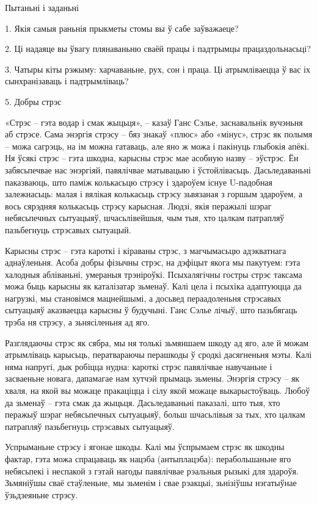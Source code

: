 Пытаньні і заданьні

1. Якія самыя раньнія прыкметы стомы вы ў сабе заўважаеце?

2. Ці надаяце вы ўвагу плянаваньню сваёй працы і падтрымцы працаздольнасьці?

3. Чатыры кіты рэжыму: харчаваньне, рух, сон і праца. Ці атрымліваецца ў вас іх сынхранізаваць і падтрымліваць?


5. Добры стрэс

«Стрэс – гэта водар і смак жыцьця», – казаў Ганс Сэлье, заснавальнік вучэньня аб стрэсе. Сама энэргія стрэсу – бяз знакаў «плюс» або «мінус», стрэс як полымя – можа сагрэць, на ім можна гатаваць, але яно ж можа і пакінуць глыбокія апёкі. Ня ўсякі стрэс – гэта шкодна, карысны стрэс мае асобную назву – эўстрэс. Ён забясьпечвае нас энэргіяй, павялічвае матывацыю і ўстойлівасьць. Дасьледаваньні паказваюць, што паміж колькасьцю стрэсу і здароўем існуе U-падобная залежнасьць: малая і вялікая колькасьць стрэсу зьвязаная з горшым здароўем, а вось сярэдняя колькасьць стрэсу карысная. Людзі, якія перажылі шэраг небясьпечных сытуацыяў, шчасьлівейшыя, чым тыя, хто цалкам патрапляў пазьбегнуць стрэсавых сытуацый.

Карысны стрэс – гэта кароткі і кіраваны стрэс, з магчымасьцю адэкватнага аднаўленьня. Асоба добры фізычны стрэс, на дэфіцыт якога мы пакутуем: гэта халодныя абліваньні, умераныя трэніроўкі. Псыхалягічны гостры стрэс таксама можа быць карысны як каталізатар зьменаў. Калі цела і псыхіка адаптуюцца да нагрузкі, мы становімся мацнейшымі, а досьвед пераадоленьня стрэсавых сытуацыяў аказваецца карысны ў будучыні. Ганс Сэлье лічыў, што пазьбягаць трэба ня стрэсу, а зьнясіленьня ад яго.

Разглядаючы стрэс як сябра, мы ня толькі зьмяншаем шкоду ад яго, але й можам атрымліваць карысьць, ператвараючы перашкоды ў сродкі дасягненьня мэты. Калі няма напругі, дык робіцца нудна: кароткі стрэс павялічвае навучаньне і засваеньне новага, дапамагае нам хутчэй прымаць зьмены. Энэргія стрэсу – як хваля, на якой вы можаце пракаціцца і сілу якой можаце выкарыстоўваць. Любоў да зьменаў – гэта смак да жыцьця. Дасьледаваньні паказалі, што тыя, хто перажыў шэраг небясьпечных сытуацыяў, больш шчасьлівыя за тых, хто цалкам патрапляў пазьбегнуць стрэсавых сытуацыяў.

Успрыманьне стрэсу і ягонае шкоды. Калі мы ўспрымаем стрэс як шкодны фактар, гэта можа спрацаваць як нацэба (антыплацэба): перабольшаньне яго небясьпекі і неспакой з гэтай нагоды павялічвае рэальныя рызыкі для здароўя. Зьмяніўшы сваё стаўленьне, мы зьменім і свае рэакцыі, зьнізіўшы нэгатыўнае ўзьдзеяньне стрэсу.

